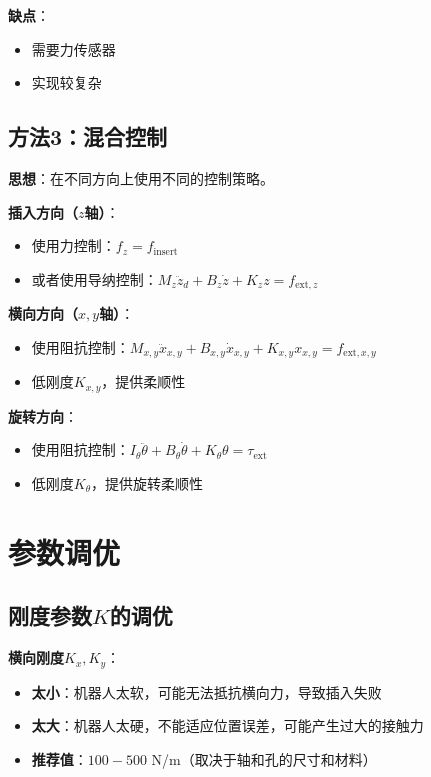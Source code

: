 \documentclass[12pt,a4paper]{article}
\begin{document}
\textbf{缺点}：
\begin{itemize}
\item 需要力传感器
\item 实现较复杂
\end{itemize}

\subsection{方法3：混合控制}

\textbf{思想}：在不同方向上使用不同的控制策略。

\textbf{插入方向（$z$轴）}：
\begin{itemize}
\item 使用力控制：$f_z = f_{\text{insert}}$
\item 或者使用导纳控制：$M_z\ddot{z}_d + B_z\dot{z} + K_z z = f_{\text{ext},z}$
\end{itemize}

\textbf{横向方向（$x, y$轴）}：
\begin{itemize}
\item 使用阻抗控制：$M_{x,y}\ddot{x}_{x,y} + B_{x,y}\dot{x}_{x,y} + K_{x,y}x_{x,y} = f_{\text{ext},x,y}$
\item 低刚度$K_{x,y}$，提供柔顺性
\end{itemize}

\textbf{旋转方向}：
\begin{itemize}
\item 使用阻抗控制：$I_{\theta}\ddot{\theta} + B_{\theta}\dot{\theta} + K_{\theta}\theta = \tau_{\text{ext}}$
\item 低刚度$K_{\theta}$，提供旋转柔顺性
\end{itemize}

\section{参数调优}

\subsection{刚度参数$K$的调优}

\textbf{横向刚度$K_x, K_y$}：
\begin{itemize}
\item \textbf{太小}：机器人太软，可能无法抵抗横向力，导致插入失败
\item \textbf{太大}：机器人太硬，不能适应位置误差，可能产生过大的接触力
\item \textbf{推荐值}：$100-500$ N/m（取决于轴和孔的尺寸和材料）
\end{itemize}
\end{document}

